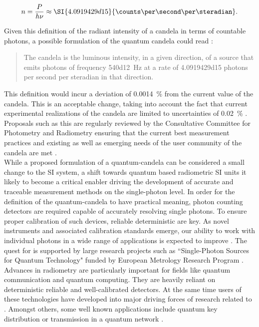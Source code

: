 		\begin{equation}
			n = \frac{P}{h \nu} \approx \SI{4.0919429d15}{\counts\per\second\per\steradian}.
		\end{equation}

	Given this definition of the radiant intensity of a candela in terms of countable photons, a possible formulation of the quantum candela could read \cite{Cheung2007}:

	\begin{quote}
		The candela is the luminous intensity, in a given direction, of a source that emits photons of frequency \SI{540d12}{\hertz} at a rate of \num{4.0919429d15} photons per second per steradian in that direction.
	\end{quote}

	This definition would incur a deviation of \SI{0.0014}{\percent} from the current value of the candela. This is an acceptable change, taking into account the fact that current experimental realizations of the candela are limited to uncertainties of \SI{0.02}{\percent} \cite{Cheung2007}. Proposals such as this are regularly reviewed by the Consultative Committee for Photometry and Radiometry ensuring that the current best measurement practices and existing as well as emerging needs of the user community of the candela are met \cite{zwinkels2010photometry}.
	\\
	While a proposed formulation of a quantum-candela can be considered a small change to the SI system, a shift towards quantum based radiometric SI units it likely to become a critical enabler driving the development of accurate and traceable measurement methods on the single-photon level. In order for the definition of the quantum-candela to have practical meaning, photon counting detectors are required capable of accurately resolving single photons. To ensure proper calibration of such devices, reliable deterministic \spss are key. As novel instruments and associated calibration standards emerge, our ability to work with individual photons in a wide range of applications is expected to improve \cite{buller2009single, eisaman2011invited, sangouard2012single, chunnilall2014metrology}. The quest for \spss is supported by large research projects such as ``Single-Photon Sources for Quantum Technology" funded by European Metrology Research Program \cite{SiquteProject,QuCandelaProject}.
	\\
	Advances in radiometry are particularly important for fields like quantum communication and quantum computing. They are heavily reliant on deterministic reliable \spss and well-calibrated detectors. At the same time users of these technologies have developed into major driving forces of research related to \spss \cite{scheel2009single, chunnilall2014metrology}. Amongst others, some well known applications include quantum key distribution \cite{bennett2014quantum, beveratos2002single, alleaume2004experimental} or transmission in a quantum network \cite{childress2006fault, bernien2012two, pfaff2014unconditional}.
